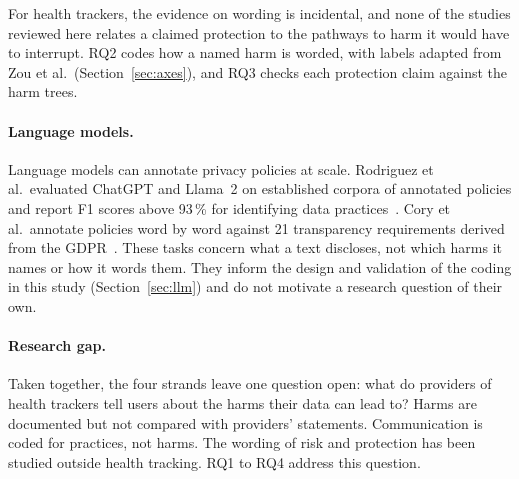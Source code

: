 For health trackers, the evidence on wording is incidental, and none of the studies reviewed here relates a
claimed protection to the pathways to harm it would have to interrupt. RQ2
codes how a named harm is worded, with labels adapted from Zou et al.\
(Section~\ref{sec:axes}), and RQ3 checks each protection claim against the harm
trees.

\paragraph{Language models.} Language models can annotate privacy policies at
scale. Rodriguez et al.\ evaluated ChatGPT and Llama~2 on established corpora of
annotated policies and report F1 scores above 93\,\% for identifying data
practices~\parencite{rodriguez2024llm}. Cory et al.\ annotate policies word by
word against 21 transparency requirements derived from the
GDPR~\parencite{cory2026wordlevel}. These tasks concern what a text discloses,
not which harms it names or how it words them. They inform the design and
validation of the coding in this study (Section~\ref{sec:llm}) and do not
motivate a research question of their own.

\paragraph{Research gap.} Taken together, the four strands leave one question
open: what do providers of health trackers tell users about the harms their
data can lead to? Harms are documented but not compared with providers'
statements. Communication is coded for practices, not harms. The wording of
risk and protection has been studied outside health tracking. RQ1 to RQ4
address this question.
